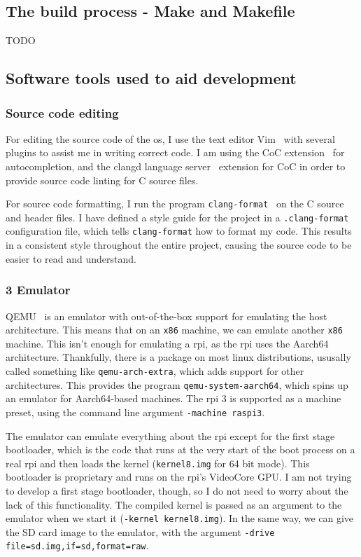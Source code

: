 \documentclass{article}
\begin{document}
\subsection{The build process - Make and Makefile}
TODO

\subsection{Software tools used to aid development}
\subsubsection{Source code editing}
For editing the source code of the \gls{os}, I use the text editor
Vim~\cite{vim} with several plugins to assist me in writing correct code. I am
using the CoC extension~\cite{vim-coc} for autocompletion, and the clangd
language server~\cite{clangd} extension for CoC in order to provide source code
linting for C source files.

For source code formatting, I run the program
\texttt{clang-format}~\cite{clang-format} on the C source and header files. I
have defined a style guide for the project in a \texttt{.clang-format}
configuration file, which tells \texttt{clang-format} how to format my code.
This results in a consistent style throughout the entire project, causing the
source code to be easier to read and understand.

\subsubsection{\texorpdfstring{}{RPi} 3 Emulator}
QEMU~\cite{qemu} is an emulator with out-of-the-box support for emulating the
host architecture. This means that on an \texttt{x86} machine, we can
emulate another \texttt{x86} machine. This isn't enough for emulating a
\gls{rpi}, as the \gls{rpi} uses the Aarch64 architecture. Thankfully, there is
a package on most linux distributions, ususally called something like
\texttt{qemu-arch-extra}, which adds support for other architectures. This
provides the program \texttt{qemu-system-aarch64}, which spins up an emulator
for Aarch64-based machines. The \gls{rpi} 3 is supported as a machine preset,
using the command line argument \texttt{-machine raspi3}.

The emulator can emulate everything about the \gls{rpi} except for the first
stage bootloader, which is the code that runs at the very start of the boot
process on a real \gls{rpi} and then loads the kernel (\texttt{kernel8.img}
for 64 bit mode). This bootloader is proprietary and runs on the \gls{rpi}'s
VideoCore GPU. I am not trying to develop a first stage bootloader, though, so
I do not need to worry about the lack of this functionality. The compiled
kernel is passed as an argument to the emulator when we start it
(\texttt{-kernel kernel8.img}). In the same way, we can give the SD card image
to the emulator, with the argument \texttt{-drive
file=sd.img,if=sd,format=raw}.
\end{document}
